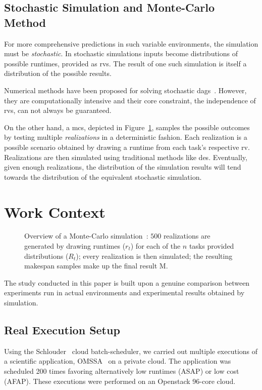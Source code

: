 \documentclass[10pt,conference,compsocconf]{IEEEtran}
\begin{document}
\subsection{Stochastic Simulation and Monte-Carlo Method}

\label{sc:relwork-stochastic}
For  more   comprehensive  predictions  in  such   variable  environments,  the
simulation must  be \emph{stochastic}.  In stochastic simulations  inputs become
distributions of possible runtimes, provided as \acp{rv}.
The  result  of one  such  simulation  is  itself  a distribution of the
possible results.

Numerical methods have been proposed for solving stochastic
\acp{dag}~\cite{Li97,Ludwig01}. However, they are computationally intensive and
their core constraint, the independence of \acp{rv}, can not always be
guaranteed. 

On the other hand, a \ac{mcs}, depicted in Figure~\ref{fig:mc-process}, samples
the possible outcomes by testing  multiple \emph{realizations} in a
deterministic fashion.  Each realization is a possible scenario obtained by
drawing a runtime from each task's respective \ac{rv}.  Realizations are then
simulated using traditional methods like \ac{des}.  Eventually, given enough
realizations, the distribution of the simulation results will  tend towards the
distribution of the equivalent stochastic simulation. 

\section{Work Context}
\label{sec:work-context}
\begin{figure}
	\centering
	\resizebox{0.9\linewidth}{!}{%
		
		}
\caption{Overview of a Monte-Carlo simulation~: $500$ realizations are generated
	by drawing runtimes ($r_t$) for each of the $n$ tasks provided
	distributions ($R_t$); every realization is then simulated; the 
	resulting makespan samples make up the final result M.}\label{fig:mc-process}
\end{figure}

The  study conducted  in this  paper  is built upon a genuine comparison  between
experiments  run in  actual environments  and experimental  results obtained  by
simulation.  

\subsection{Real Execution Setup}
Using the Schlouder~\cite{Michon17} cloud batch-scheduler, we carried out
multiple executions of a scientific application, OMSSA~\cite{Geer2004} on a
private cloud.
The application was scheduled 200 times favoring alternatively low runtimes (ASAP) or 
low cost (AFAP). These executions were performed on an Openstack 96-core cloud. 
\end{document}
